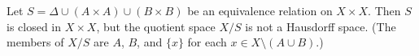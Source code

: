 Let $S = \Delta \cup (A \times A) \cup (B \times B)$ be an equivalence relation on $X \times X$. Then $S$ is closed in $X \times X$, but the quotient space $X / S$ is not a Hausdorff space. (The members of $X / S$ are $A$, $B$, and $\{x\}$ for each $x \in X \setminus (A \cup B)$.)
